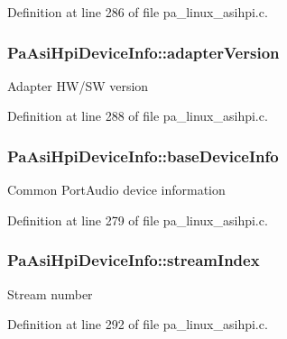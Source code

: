 Definition at line 286 of file pa\+\_\+linux\+\_\+asihpi.\+c.

\subsubsection[{\texorpdfstring{adapter\+Version}{adapterVersion}}]{ Pa\+Asi\+Hpi\+Device\+Info\+::adapter\+Version}\hypertarget{struct_pa_asi_hpi_device_info_ae7f2d9b7af773915ce4b03d17638c4ae}{}\label{struct_pa_asi_hpi_device_info_ae7f2d9b7af773915ce4b03d17638c4ae}
Adapter H\+W/\+SW version 

Definition at line 288 of file pa\+\_\+linux\+\_\+asihpi.\+c.

\subsubsection[{\texorpdfstring{base\+Device\+Info}{baseDeviceInfo}}]{ Pa\+Asi\+Hpi\+Device\+Info\+::base\+Device\+Info}\hypertarget{struct_pa_asi_hpi_device_info_a6901f154dd53fd482f1295154018cd13}{}\label{struct_pa_asi_hpi_device_info_a6901f154dd53fd482f1295154018cd13}
Common Port\+Audio device information 

Definition at line 279 of file pa\+\_\+linux\+\_\+asihpi.\+c.

\subsubsection[{\texorpdfstring{stream\+Index}{streamIndex}}]{ Pa\+Asi\+Hpi\+Device\+Info\+::stream\+Index}\hypertarget{struct_pa_asi_hpi_device_info_afb6ffc3f50ee76abda0d9a816016ed59}{}\label{struct_pa_asi_hpi_device_info_afb6ffc3f50ee76abda0d9a816016ed59}
Stream number 

Definition at line 292 of file pa\+\_\+linux\+\_\+asihpi.\+c.

